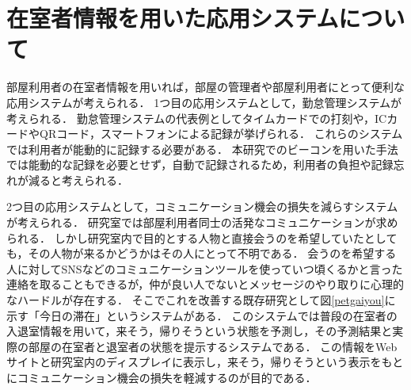 
\section{在室者情報を用いた応用システムについて}\label{3.4}
部屋利用者の在室者情報を用いれば，部屋の管理者や部屋利用者にとって便利な応用システムが考えられる．
1つ目の応用システムとして，勤怠管理システムが考えられる．
勤怠管理システムの代表例としてタイムカードでの打刻や，ICカードやQRコード，スマートフォンによる記録が挙げられる．
これらのシステムでは利用者が能動的に記録する必要がある．
本研究でのビーコンを用いた手法では能動的な記録を必要とせず，自動で記録されるため，利用者の負担や記録忘れが減ると考えられる．

2つ目の応用システムとして，コミュニケーション機会の損失を減らすシステムが考えられる．
研究室では部屋利用者同士の活発なコミュニケーションが求められる．
しかし研究室内で目的とする人物と直接会うのを希望していたとしても，その人物が来るかどうかはその人にとって不明である．
会うのを希望する人に対してSNSなどのコミュニケーションツールを使っていつ頃くるかと言った連絡を取ることもできるが，仲が良い人でないとメッセージのやり取りに心理的なハードルが存在する．
そこでこれを改善する既存研究として図\ref{petgaiyou}に示す「今日の滞在」というシステムがある．
このシステムでは普段の在室者の入退室情報を用いて，来そう，帰りそうという状態を予測し，その予測結果と実際の部屋の在室者と退室者の状態を提示するシステムである．
この情報をWebサイトと研究室内のディスプレイに表示し，来そう，帰りそうという表示をもとにコミュニケーション機会の損失を軽減するのが目的である．

